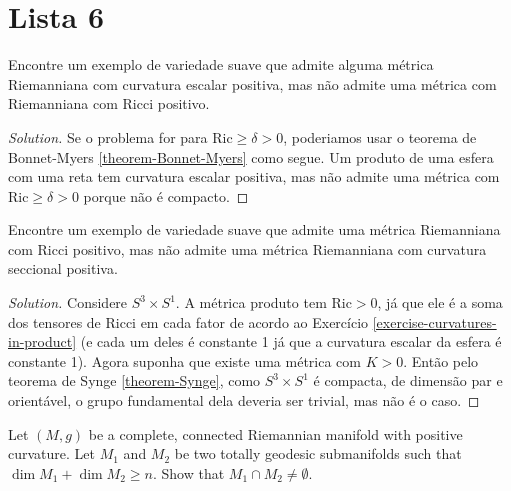 \section{Lista 6}
\label{section-lista-6}

\begin{exercise}
\label{exercise-positive-scalar-but-no-positive-Ricci}
Encontre um exemplo de variedade suave que admite alguma métrica Riemanniana com
curvatura escalar positiva, mas não admite uma métrica com Riemanniana com Ricci
positivo.
\end{exercise}

\begin{proof}[Solution]
Se o problema for para $\text{Ric}\geq \delta>0$, poderiamos usar o teorema de 
Bonnet-Myers \ref{theorem-Bonnet-Myers} como segue. Um produto de uma esfera com
uma reta tem curvatura escalar positiva, mas não admite uma métrica com 
$\text{Ric}\geq\delta>0$ porque não é compacto.
\end{proof}

\begin{exercise}
\label{exercise-positive-Ricci-but-no-positive-sectional}
Encontre um exemplo de variedade suave que admite uma métrica Riemanniana com
Ricci positivo, mas não admite uma métrica Riemanniana com curvatura seccional
positiva.
\end{exercise}

\begin{proof}[Solution]
Considere $S^3\times S^1$. A métrica produto tem $\text{Ric}>0$, já que ele é a
soma dos tensores de Ricci em cada fator de acordo ao Exercício 
\ref{exercise-curvatures-in-product} (e cada um deles é constante 1 já que a 
curvatura escalar da esfera é constante 1). Agora suponha que existe uma métrica
com $K>0$. Então pelo teorema de Synge \ref{theorem-Synge}, como
$S^3\times S^1$ é compacta, de dimensão par e orientável, o grupo fundamental
dela deveria ser trivial, mas não é o caso.
\end{proof}

\begin{exercise}
\label{exercise-two-totally-geodesic-submanifolds}
Let $(M,g)$ be a complete, connected Riemannian manifold with positive
curvature. Let $M_1$ and $M_2$ be two totally geodesic submanifolds such that
$\dim M_1+\dim M_2\geq n$. Show that $M_1\cap M_2\neq \emptyset$.
\end{exercise}

